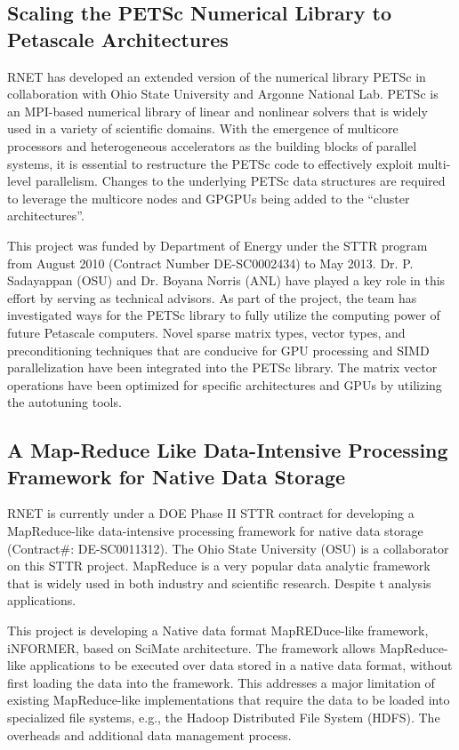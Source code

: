 \subsection{Scaling the PETSc Numerical Library to Petascale Architectures}

RNET has developed an extended version of the numerical library PETSc \cite{Lowell1} in
collaboration with Ohio State University and Argonne National Lab. PETSc is an MPI-based numerical library of
linear and nonlinear solvers that is widely used in a variety of scientific domains. With the
emergence of multicore processors and heterogeneous accelerators as the building blocks of
parallel systems, it is essential to restructure the PETSc code to effectively exploit multi-level
parallelism. Changes to the underlying PETSc data structures are required to leverage the multicore
nodes and GPGPUs being added to the ``cluster architectures''.

This project was funded by Department of Energy under the STTR program from August 2010 (Contract Number DE-SC0002434) 
to May 2013. Dr. P. Sadayappan (OSU) and Dr. Boyana Norris (ANL) have played a key role in this effort by serving as 
technical advisors. As part of the project, the team has investigated ways for the PETSc library to fully utilize the 
computing power of future Petascale computers. Novel sparse matrix types,  vector types, and preconditioning techniques 
that are conducive for GPU processing and SIMD parallelization have been integrated into the PETSc library. The matrix 
vector operations have been optimized for specific architectures and GPUs by 
utilizing the autotuning tools.


\subsection{A Map-Reduce Like Data-Intensive Processing Framework for Native Data Storage}

RNET is currently under a DOE Phase II STTR contract for developing a MapReduce-like data-intensive processing framework 
for native data storage (Contract\#: DE-SC0011312). The Ohio State University (OSU) is a collaborator on this STTR project. 
MapReduce is a very popular data analytic framework that is widely used in both industry and scientific research. Despite 
t%
analysis applications.

This project is developing a Native data format MapREDuce-like framework, iNFORMER, based on SciMate architecture. The 
framework allows MapReduce-like applications to be executed over data stored in a native data format, without first loading 
the data into the framework. This addresses a major limitation of existing MapReduce-like implementations that require the 
data to be loaded into specialized file systems, e.g., the Hadoop Distributed File System (HDFS). The overheads and additional
data management process.


